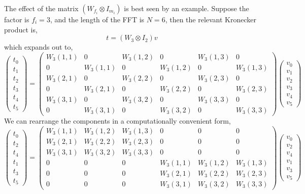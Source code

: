 \documentclass[fleqn,12pt]{article}
\begin{document}
The effect of the matrix $(W_{f_i} \otimes I_{m_i})$ is best seen by
an example. Suppose the factor is $f_i = 3$, and the length of the FFT
is $N=6$, then the relevant Kronecker product is,
%
\begin{equation}
t = (W_3 \otimes I_2) v 
\end{equation}
%
which expands out to,
%
\begin{equation}
\left(
\begin{array}{c}
t_0 \\
t_1 \\
t_2 \\
t_3 \\
t_4 \\
t_5
\end{array}
\right)
=
\left(
\begin{array}{cccccc}
W_3(1,1) & 0 & W_3(1,2) & 0 & W_3(1,3) & 0 \\
0 & W_3(1,1) & 0 & W_3(1,2) & 0 & W_3(1,3) \\
W_3(2,1) & 0 & W_3(2,2) & 0 & W_3(2,3) & 0 \\
0 & W_3(2,1) & 0 & W_3(2,2) & 0 & W_3(2,3) \\
W_3(3,1) & 0 & W_3(3,2) & 0 & W_3(3,3) & 0 \\
0 & W_3(3,1) & 0 & W_3(3,2) & 0 & W_3(3,3) 
\end{array}
\right)
\left(
\begin{array}{c}
v_0 \\
v_1 \\
v_2 \\
v_3 \\
v_4 \\
v_5
\end{array}
\right)
\end{equation}
%
We can rearrange the components in a computationally convenient form,
\begin{equation}
\left(
\begin{array}{c}
t_0 \\
t_2 \\
t_4 \\
t_1 \\
t_3 \\
t_5
\end{array}
\right)
=
\left(
\begin{array}{cccccc}
W_3(1,1) & W_3(1,2) & W_3(1,3) & 0 & 0 & 0 \\
W_3(2,1) & W_3(2,2) & W_3(2,3) & 0 & 0 & 0 \\
W_3(3,1) & W_3(3,2) & W_3(3,3) & 0 & 0 & 0 \\
0 & 0 & 0 & W_3(1,1) & W_3(1,2) & W_3(1,3) \\
0 & 0 & 0 & W_3(2,1) & W_3(2,2) & W_3(2,3) \\
0 & 0 & 0 & W_3(3,1) & W_3(3,2) & W_3(3,3)
\end{array}
\right)
\left(
\begin{array}{c}
v_0 \\
v_2 \\
v_4 \\
v_1 \\
v_3 \\
v_5
\end{array}
\right)
\end{equation}
\end{document}
